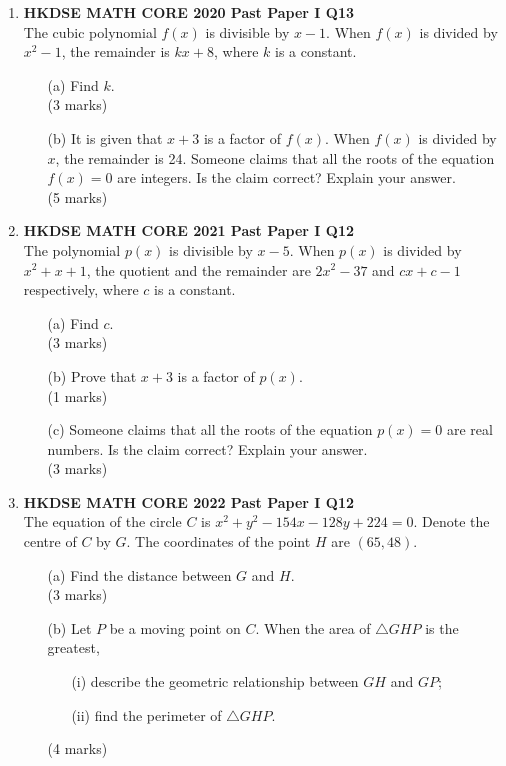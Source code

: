 \documentclass[12pt]{article}
\begin{document}
\begin{enumerate}
	\item \textbf{HKDSE MATH CORE 2020 Past Paper I Q13}\\
	The cubic polynomial $f(x)$ is divisible by $x-1$. When $f(x)$ is divided by $x^2-1$, the remainder is $kx+8$, where $k$ is a constant.
	\begin{enumerate}
		\item[(a)] Find $k$. \\(3 marks)
		\item[(b)] It is given that $x+3$ is a factor of $f(x)$. When $f(x)$ is divided by $x$, the remainder is 24. Someone claims that all the roots of the equation $f(x) = 0$ are integers. Is the claim correct? Explain your answer. \\(5 marks)
	\end{enumerate}
	\newpage

	\item \textbf{HKDSE MATH CORE 2021 Past Paper I Q12}\\	
	The polynomial $p(x)$ is divisible by $x - 5$. When $p(x)$ is divided by $x^2 + x + 1$, the quotient and the remainder are $2x^2 - 37$ and $cx + c - 1$ respectively, where $c$ is a constant.
	\begin{enumerate}
		\item[(a)] Find $c$. \\(3 marks)
		\item[(b)] Prove that $x+3$ is a factor of $p(x)$. \\(1 marks)
		\item[(c)] Someone claims that all the roots of the equation $p(x) = 0$ are real numbers. Is the claim correct? Explain your answer. \\(3 marks)
	\end{enumerate}
	\newpage

	\item \textbf{HKDSE MATH CORE 2022 Past Paper I Q12}\\
	The equation of the circle $C$ is $x^2 + y^2 - 154x - 128y + 224 = 0$. Denote the centre of $C$ by $G$. The coordinates of the point $H$ are $(65, 48)$.
	\begin{enumerate}
		\item[(a)] Find the distance between $G$ and $H$. \\(3 marks)
		\item[(b)] Let $P$ be a moving point on $C$. When the area of $\triangle GHP$ is the greatest,
		\begin{enumerate}
			\item[(i)] describe the geometric relationship between $GH$ and $GP$;
			\item[(ii)] find the perimeter of $\triangle GHP$.
		\end{enumerate}
		(4 marks)
	\end{enumerate}
	\newpage


\end{enumerate}
\end{document}
